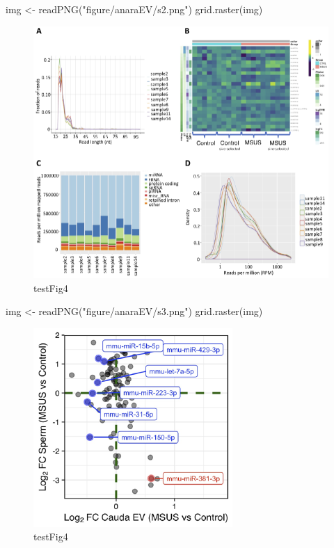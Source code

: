 \documentclass[12pt,twoside]{reedthesis}
\newenvironment{Shaded}{\begin{snugshade}}{\end{snugshade}}
\newcommand{\FunctionTok}[1]{\textcolor[rgb]{0.00,0.00,0.00}{#1}}
\newcommand{\NormalTok}[1]{#1}
\newcommand{\OtherTok}[1]{\textcolor[rgb]{0.56,0.35,0.01}{#1}}
\newcommand{\StringTok}[1]{\textcolor[rgb]{0.31,0.60,0.02}{#1}}
\begin{document}
\begin{Shaded}
\begin{Highlighting}[]
\NormalTok{img }\OtherTok{\textless{}{-}} \FunctionTok{readPNG}\NormalTok{(}\StringTok{"figure/anaraEV/s2.png"}\NormalTok{)}
\FunctionTok{grid.raster}\NormalTok{(img)}
\end{Highlighting}
\end{Shaded}
\begin{figure}[H]

{\centering \includegraphics{thesis_files/figure-latex/sfig2-1} 

}

\caption{testFig4}\label{fig:sfig2}
\end{figure}
\begin{Shaded}
\begin{Highlighting}[]
\NormalTok{img }\OtherTok{\textless{}{-}} \FunctionTok{readPNG}\NormalTok{(}\StringTok{"figure/anaraEV/s3.png"}\NormalTok{)}
\FunctionTok{grid.raster}\NormalTok{(img)}
\end{Highlighting}
\end{Shaded}
\begin{figure}[H]

{\centering \includegraphics{thesis_files/figure-latex/sfig3-1} 

}

\caption{testFig4}\label{fig:sfig3}
\end{figure}
\end{document}
